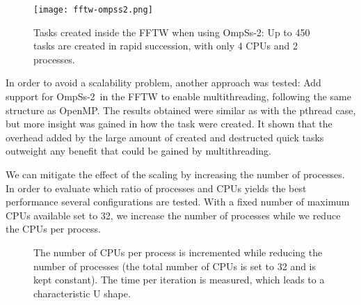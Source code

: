 \begin{figure}[h]
	\centering
	\texttt{[image: fftw-ompss2.png]}
	\caption{Tasks created inside the FFTW when using OmpSs-2: Up to 450 tasks are 
	created in rapid succession, with only 4 CPUs and 2 processes.}
	\label{fig:fftw-ompss2}
\end{figure}

In order to avoid a scalability problem, another approach was tested: Add 
support for OmpSs-2~in the FFTW to enable multithreading, following the same 
structure as OpenMP. The results obtained were similar as with the pthread case, 
but more insight was gained in how the task were created. It shown that the 
overhead added by the large amount of created and destructed quick tasks 
outweight any benefit that could be gained by multithreading.


We can mitigate the effect of the scaling by increasing the number of processes.  
In order to evaluate which ratio of processes and CPUs yields the best 
performance several configurations are tested. With a fixed number of maximum 
CPUs available set to 32, we increase the number of processes while we reduce 
the CPUs per process.


\begin{figure}[h]
	\centering
	\caption{The number of CPUs per process is incremented while reducing the 
	number of processes (the total number of CPUs is set to 32 and is kept 
	constant).  The time per iteration is measured, which leads to a 
	characteristic U shape.}
\end{figure}



